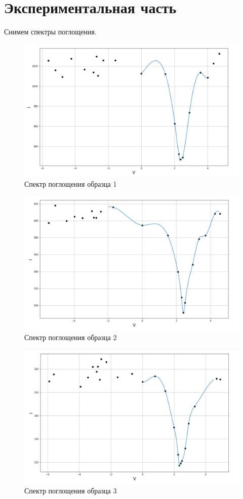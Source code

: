 \documentclass[a4paper,12pt]{article}
\begin{document}
		\newpage
		
		\section{Экспериментальная часть}
			Снимем спектры поглощения.
			
			\begin{figure}[h!]
				\centering
				\includegraphics[width=0.95\linewidth]{1obr}
				\caption{Спектр поглощения образца 1}
			\end{figure}
			
			\begin{figure}[h!]
				\centering
				\includegraphics[width=0.95\linewidth]{2obr}
				\caption{Спектр поглощения образца 2}
			\end{figure}
			
				\begin{figure}[h!]
					\centering
					\includegraphics[width=0.95\linewidth]{3obr}
					\caption{Спектр поглощения образца 3}
				\end{figure}
				
\end{document}
